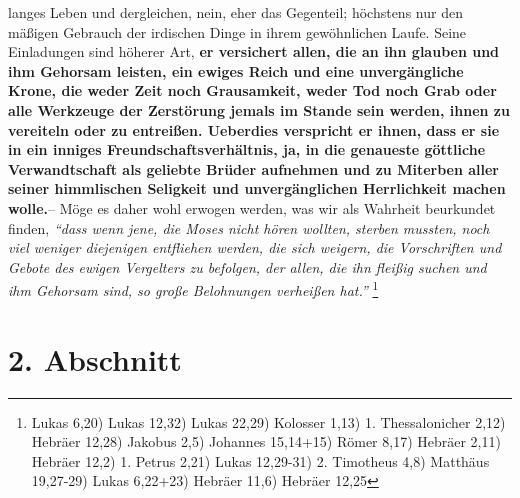 langes Leben und dergleichen, nein, eher das Gegenteil; höchstens nur den
mäßigen Gebrauch der irdischen Dinge in ihrem gewöhnlichen Laufe. Seine
Einladungen sind höherer Art,
\textbf{er versichert allen, die an ihn glauben und ihm
Gehorsam leisten, ein ewiges Reich und eine unvergängliche Krone, die weder
Zeit noch Grausamkeit, weder Tod noch Grab oder alle Werkzeuge der Zerstörung
jemals im Stande sein werden, ihnen zu vereiteln oder zu entreißen. Ueberdies
verspricht er ihnen, dass er sie in ein inniges Freundschaftsverhältnis, ja, in
die genaueste göttliche Verwandtschaft als geliebte Brüder aufnehmen und zu
Miterben aller seiner himmlischen Seligkeit und unvergänglichen Herrlichkeit
machen wolle.}-- Möge es daher wohl erwogen werden, was wir als Wahrheit
beurkundet finden,
\textit{"`dass wenn jene, die Moses nicht hören wollten, sterben
mussten, noch viel weniger diejenigen entfliehen werden, die sich weigern, die
Vorschriften und Gebote des ewigen Vergelters zu befolgen, der allen, die ihn
fleißig suchen und ihm Gehorsam sind, so große Belohnungen verheißen
hat."'}
\footnote{
Lukas 6,20)
Lukas 12,32)
Lukas 22,29)
Kolosser 1,13)
1. Thessalonicher 2,12)
Hebräer 12,28)
Jakobus 2,5)
Johannes 15,14+15)
Römer 8,17)
Hebräer 2,11)
Hebräer 12,2)
1. Petrus 2,21)
Lukas 12,29-31)
2. Timotheus 4,8)
Matthäus 19,27-29)
Lukas 6,22+23)
Hebräer 11,6)
Hebräer 12,25}

\section{2. Abschnitt} \label{kap16_ab2}


